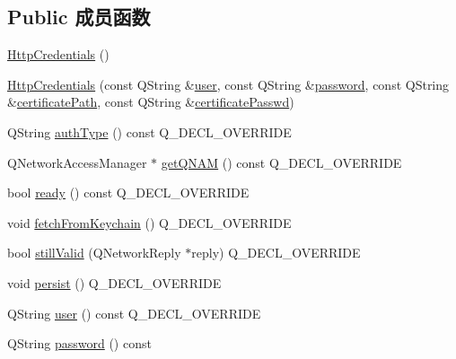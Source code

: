 \subsection*{Public 成员函数}
\begin{DoxyCompactItemize}
\item 
\hyperlink{class_o_c_c_1_1_http_credentials_a4d750c065169740b078f4483cd0211fb}{Http\+Credentials} ()
\item 
\hyperlink{class_o_c_c_1_1_http_credentials_a2c6e2c5df342e600fde5b7c228b74bd4}{Http\+Credentials} (const Q\+String \&\hyperlink{class_o_c_c_1_1_http_credentials_a017bf9144c7659f777b9aabc98e03987}{user}, const Q\+String \&\hyperlink{class_o_c_c_1_1_http_credentials_aee8a84580d869fce1b4f2be0cc053e77}{password}, const Q\+String \&\hyperlink{class_o_c_c_1_1_http_credentials_ab6094da7334d34d1cce27e439d9ab444}{certificate\+Path}, const Q\+String \&\hyperlink{class_o_c_c_1_1_http_credentials_a3e5fc4ef75516f5603579a566e1d3601}{certificate\+Passwd})
\item 
Q\+String \hyperlink{class_o_c_c_1_1_http_credentials_acce877fa4e92ef60246a048cb4b073ac}{auth\+Type} () const Q\+\_\+\+D\+E\+C\+L\+\_\+\+O\+V\+E\+R\+R\+I\+DE
\item 
Q\+Network\+Access\+Manager $\ast$ \hyperlink{class_o_c_c_1_1_http_credentials_ab35f0246f13eb9901a8d6a719db8046e}{get\+Q\+N\+AM} () const Q\+\_\+\+D\+E\+C\+L\+\_\+\+O\+V\+E\+R\+R\+I\+DE
\item 
bool \hyperlink{class_o_c_c_1_1_http_credentials_afa37b021762c649fe434024130edba4b}{ready} () const Q\+\_\+\+D\+E\+C\+L\+\_\+\+O\+V\+E\+R\+R\+I\+DE
\item 
void \hyperlink{class_o_c_c_1_1_http_credentials_a2408a2a5b97336cc09219323e98bca65}{fetch\+From\+Keychain} () Q\+\_\+\+D\+E\+C\+L\+\_\+\+O\+V\+E\+R\+R\+I\+DE
\item 
bool \hyperlink{class_o_c_c_1_1_http_credentials_aa3b307bb0e1bd48b5bc55aa9f096d733}{still\+Valid} (Q\+Network\+Reply $\ast$reply) Q\+\_\+\+D\+E\+C\+L\+\_\+\+O\+V\+E\+R\+R\+I\+DE
\item 
void \hyperlink{class_o_c_c_1_1_http_credentials_a643967b90af32f27a6d076608ef7dccc}{persist} () Q\+\_\+\+D\+E\+C\+L\+\_\+\+O\+V\+E\+R\+R\+I\+DE
\item 
Q\+String \hyperlink{class_o_c_c_1_1_http_credentials_a017bf9144c7659f777b9aabc98e03987}{user} () const Q\+\_\+\+D\+E\+C\+L\+\_\+\+O\+V\+E\+R\+R\+I\+DE
\item 
Q\+String \hyperlink{class_o_c_c_1_1_http_credentials_aee8a84580d869fce1b4f2be0cc053e77}{password} () const

\end{DoxyCompactItemize}
